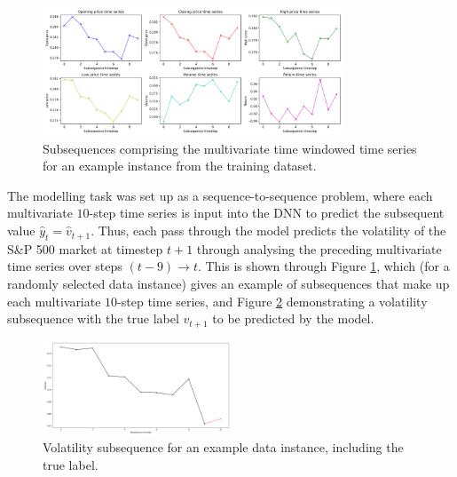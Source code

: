 \documentclass[a4paper, 11pt]{report}
\begin{document}


    \begin{figure}[ht]
        \centering
        \includegraphics[width=0.8\textwidth]{subsequences.png}
        \caption{\centering Subsequences comprising the multivariate time windowed time series for an example instance from the training dataset.}
        \label{fig: subsequences}
    \end{figure}


    The modelling task was set up as a sequence-to-sequence problem, where each multivariate $10$-step time series is input into the DNN to predict the subsequent value $\hat{y}_t = \hat{v}_{t+1}$. Thus, each pass through the model predicts the volatility of the S\&P 500 market at timestep $t+1$ through analysing the preceding multivariate time series over steps $(t-9) \to t$. This is shown through Figure \ref{fig: subsequences}, which (for a randomly selected data instance) gives an example of subsequences that make up each multivariate $10$-step time series, and Figure \ref{fig: volatility-subsequence} demonstrating a volatility subsequence with the true label $v_{t+1}$ to be predicted by the model.


    \begin{figure}[ht]
        \centering
        \includegraphics[width=0.5\textwidth]{volatility-subsequence.png}
        \caption{\centering Volatility subsequence for an example data instance, including the true label.}
        \label{fig: volatility-subsequence}
    \end{figure}
\end{document}
